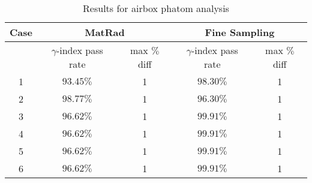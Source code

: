 \documentclass[12pt, a4paper, twoside]{book}
\begin{document}
\begin{table}[t]
\centering
\begin{tabular}{ccccc}
\toprule
Case & \multicolumn{2}{c}{MatRad} & \multicolumn{2}{c}{Fine Sampling}\\
\midrule
 & $\gamma$-index pass rate & max $\%$ diff & $\gamma$-index pass rate & max $\%$ diff\\
\midrule
1 & $93.45\%$ & 1 & $98.30\%$ &1\\
2 & $98.77\%$ & 1 & $96.30\%$ &1\\
3 & $96.62\%$ & 1 & $99.91\%$ &1\\
4 & $96.62\%$ & 1 & $99.91\%$ &1\\
5 & $96.62\%$ & 1 & $99.91\%$ &1\\
6 & $96.62\%$ & 1 & $99.91\%$ &1\\
\bottomrule
\end{tabular}
\label{tab:air}
\caption{Results for airbox phatom analysis}
\end{table}

\end{document}
